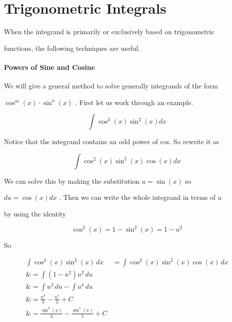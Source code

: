 \section{Trigonometric Integrals}
\label{sec:trigonometric-integrals}

When the integrand is primarily or exclusively based on trigonometric

functions, the following techniques are useful.



\paragraph{Powers of Sine and Cosine}



We will give a general method to solve generally integrands of the form

$\cos^m(x)\cdot\sin^n(x)$ . First let us work through an example.



$$\int\cos^3(x)\sin^2(x)dx$$



Notice that the integrand contains an odd power of cos. So rewrite it as



$$\int\cos^2(x)\sin^2(x)\cos(x)dx$$



We can solve this by making the substitution $u=\sin(x)$ so

$du=\cos(x)dx$ . Then we can write the whole integrand in terms of $u$

by using the identity



$$\cos^2(x)=1-\sin^2(x)=1-u^2$$



So



\begin{align}
\int\cos^3(x)\sin^2(x)\,dx &= \int\cos^2(x)\sin^2(x)\cos(x)\,dx \\\&= \int (1 - u^2)u^2\,du \\\&= \int u^2\,du - \int u^4\,du \\\&= \frac{u^3}{3} - \frac{u^5}{5} + C \\\&= \frac{\sin^3(x)}{3} - \frac{\sin^5(x)}{5} + C
\end{align}




